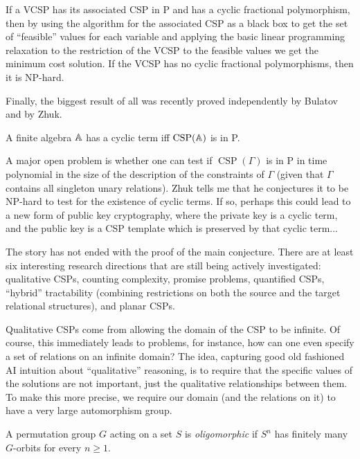 \documentclass[letterpaper,11pt]{article}
\DeclareMathOperator{\CSP}{CSP}
\begin{document}
\begin{thm} If a VCSP has its associated CSP in P and has a cyclic fractional polymorphism, then by using the algorithm for the associated CSP as a black box to get the set of ``feasible'' values for each variable and applying the basic linear programming relaxation to the restriction of the VCSP to the feasible values we get the minimum cost solution. If the VCSP has no cyclic fractional polymorphisms, then it is NP-hard.
\end{thm}

Finally, the biggest result of all was recently proved independently by Bulatov and by Zhuk.

\begin{thm} A finite algebra $\mathbb{A}$ has a cyclic term iff $\CSP(\bA)$ is in P.
\end{thm}

A major open problem is whether one can test if $\CSP(\Gamma)$ is in P in time polynomial in the size of the description of the constraints of $\Gamma$ (given that $\Gamma$ contains all singleton unary relations). Zhuk tells me that he conjectures it to be NP-hard to test for the existence of cyclic terms. If so, perhaps this could lead to a new form of public key cryptography, where the private key is a cyclic term, and the public key is a CSP template which is preserved by that cyclic term...

The story has not ended with the proof of the main conjecture. There are at least six interesting research directions that are still being actively investigated: qualitative CSPs, counting complexity, promise problems, quantified CSPs, ``hybrid'' tractability (combining restrictions on both the source and the target relational structures), and planar CSPs.

Qualitative CSPs come from allowing the domain of the CSP to be infinite. Of course, this immediately leads to problems, for instance, how can one even specify a set of relations on an infinite domain? The idea, capturing good old fashioned AI intuition about ``qualitative'' reasoning, is to require that the specific values of the solutions are not important, just the qualitative relationships between them. To make this more precise, we require our domain (and the relations on it) to have a very large automorphism group.

\begin{defn} A permutation group $G$ acting on a set $S$ is \emph{oligomorphic} if $S^n$ has finitely many $G$-orbits for every $n \ge 1$.
\end{defn}
\end{document}
